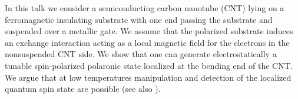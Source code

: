 In this talk we consider a semiconducting carbon nanotube (CNT) lying on a ferromagnetic insulating substrate with one end passing the substrate and suspended over a metallic gate. We assume that the polarized substrate induces an exchange interaction acting as a local magnetic field for the electrons in the nonsuspended CNT side.  We show that one can generate electrostatically a tunable spin-polarized polaronic state localized at the bending end of the CNT. We argue that at low temperatures manipulation and detection of the localized quantum spin state are possible (see also \cite{Pistolesi_2015}).
